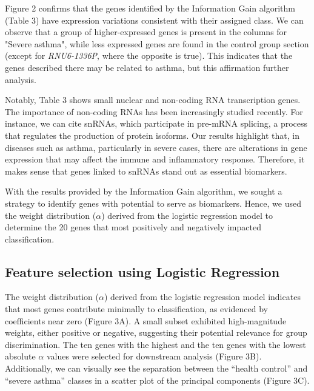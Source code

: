 Figure 2 confirms that the genes identified by the Information Gain algorithm (Table 3) have expression variations consistent with their assigned class. We can observe that a group of higher-expressed genes is present in the columns for "Severe asthma", while less expressed genes are found in the control group section (except for \textit{RNU6-1336P}, where the opposite is true). This indicates that the genes described there may be related to asthma, but this affirmation further analysis.

Notably, Table 3 shows small nuclear and non-coding RNA transcription genes. The importance of non-coding RNAs has been increasingly studied recently. For instance, we can cite snRNAs, which participate in pre-mRNA splicing, a process that regulates the production of protein isoforms. Our results highlight that, in diseases such as asthma, particularly in severe cases, there are alterations in gene expression that may affect the immune and inflammatory response. Therefore, it makes sense that genes linked to snRNAs stand out as essential biomarkers.

With the results provided by the Information Gain algorithm, we sought a strategy to identify genes with potential to serve as biomarkers. Hence, we used the weight distribution ($\alpha$) derived from the logistic regression model to determine the 20 genes that most positively and negatively impacted classification.

\subsection{Feature selection using Logistic Regression} %

The weight distribution ($\alpha$) derived from the logistic regression model indicates that most genes contribute minimally to classification, as evidenced by coefficients near zero (Figure 3A). A small subset exhibited high-magnitude weights, either positive or negative, suggesting their potential relevance for group discrimination. The ten genes with the highest and the ten genes with the lowest absolute $\alpha$ values were selected for downstream analysis (Figure 3B). Additionally, we can visually see the separation between the ``health control'' and ``severe asthma'' classes in a scatter plot of the principal components (Figure 3C).


